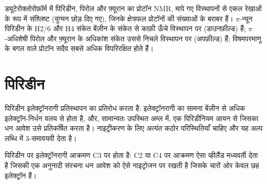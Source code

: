 \begin{omfigure}

{\small ड्यूटेरोक्लोरोफ़ॉर्म में पिरिडीन, पिरोल और फ़्यूरान का प्रोटॉन NMR, मापे गए
विस्थापनों से एकल रेखाओं के रूप में संश्लिष्ट (युग्मन छोड़ दिए गए), जिनके
क्षेत्रफल प्रोटॉनों की संख्याओं के बराबर हैं। $\pi$-न्यून पिरिडीन के H2/6 और H4
संकेत बेंज़ीन के संकेत से काफ़ी ऊँचे विस्थापन पर (डाउनफ़ील्ड) हैं; $\pi$-अधिशेषी पिरोल और फ़्यूरान
के अधिकांश संकेत उससे निचले विस्थापन पर (अपफ़ील्ड) हैं; विषमपरमाणु के बगल वाले प्रोटॉन सदैव
सबसे अधिक विपरिरक्षित होते हैं।}
\end{omfigure}

\section{पिरिडीन}

पिरिडीन इलेक्ट्रॉनरागी प्रतिस्थापन का प्रतिरोध करता है: इलेक्ट्रॉनरागी का सामना बेंज़ीन से
अधिक इलेक्ट्रॉन-निर्धन वलय से होता है, और, सामान्यतः उपस्थित अम्ल में, एक
पिरिडीनियम आयन से जिसका धन आवेश उसे प्रतिकर्षित करता है। नाइट्रीकरण के लिए अत्यंत कठोर
परिस्थितियाँ चाहिए और यह अल्प लब्धि में 3-समावयवी देता है।

\begin{proposition}[C3 पर इलेक्ट्रॉनरागी प्रतिस्थापन]\label{prop:b3:heterocycles:pyridine-c3}
पिरिडीन पर इलेक्ट्रॉनरागी आक्रमण C3 पर होता है: C2 या C4 पर आक्रमण ऐसा
व्हीलैंड मध्यवर्ती देता है जिसकी एक अनुनादी संरचना धन आवेश को ऐसे नाइट्रोजन
पर रखती है जिसके चारों ओर केवल छह इलेक्ट्रॉन हैं।
\end{proposition}

